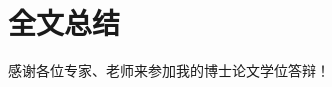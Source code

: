 \documentclass{beamer}
\begin{document}
\section{全文总结}

\begin{frame}
\end{frame}

\begin{frame}
	
\end{frame}



\begin{frame}
\centerline{感谢各位专家、老师来参加我的博士论文学位答辩！}
\end{frame}

\end{document}
